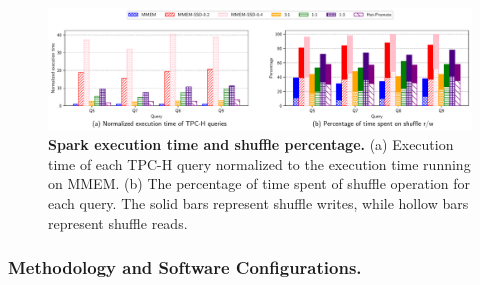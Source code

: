 \begin{figure}[t]
\centering
\includegraphics[width=1\textwidth]{fig/cxl/spark_cxl.pdf}
  \caption[Spark execution time and shuffle percentage]{\textbf{Spark execution time and shuffle percentage.} (a) Execution time of each TPC-H query normalized to the execution time running on MMEM. (b) The percentage of time spent of shuffle operation for each query. The solid bars represent shuffle writes, while hollow bars represent shuffle reads.}
\label{fig:eval_spark_1}
\end{figure}


\subsubsection{Methodology and Software Configurations.}

